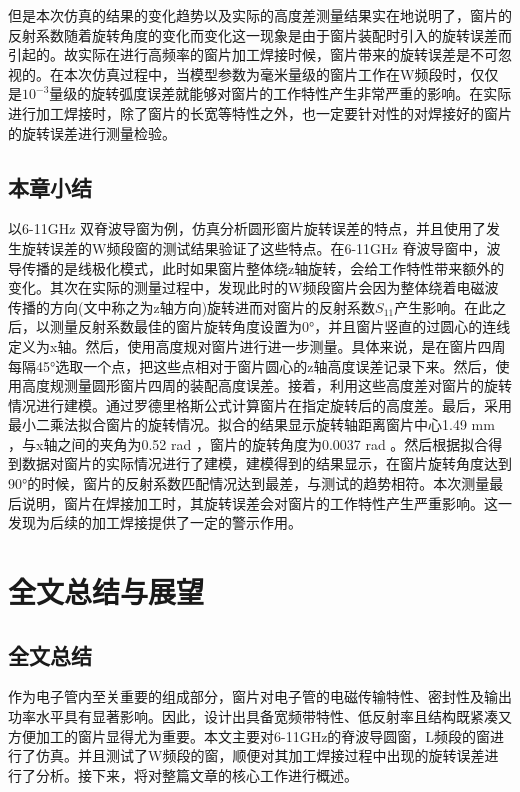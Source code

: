 \documentclass[master]{thesis-uestc}
\begin{document}
但是本次仿真的结果的变化趋势以及实际的高度差测量结果实在地说明了，窗片的反射系数随着旋转角度的变化而变化这一现象是由于窗片装配时引入的旋转误差而引起的。故实际在进行高频率的窗片加工焊接时候，窗片带来的旋转误差是不可忽视的。在本次仿真过程中，当模型参数为毫米量级的窗片工作在W频段时，仅仅是\(10^{-3}\)量级的旋转弧度误差就能够对窗片的工作特性产生非常严重的影响。在实际进行加工焊接时，除了窗片的长宽等特性之外，也一定要针对性的对焊接好的窗片的旋转误差进行测量检验。

\section{本章小结}
以6-11GHz 双脊波导窗为例，仿真分析圆形窗片旋转误差的特点，并且使用了发生旋转误差的W频段窗的测试结果验证了这些特点。在6-11GHz 脊波导窗中，波导传播的是线极化模式，此时如果窗片整体绕z轴旋转，会给工作特性带来额外的变化。其次在实际的测量过程中，发现此时的W频段窗片会因为整体绕着电磁波传播的方向(文中称之为z轴方向)旋转进而对窗片的反射系数\(S_{11}\)产生影响。在此之后，以测量反射系数最佳的窗片旋转角度设置为0°，并且窗片竖直的过圆心的连线定义为x轴。然后，使用高度规对窗片进行进一步测量。具体来说，是在窗片四周每隔45°选取一个点，把这些点相对于窗片圆心的z轴高度误差记录下来。然后，使用高度规测量圆形窗片四周的装配高度误差。接着，利用这些高度差对窗片的旋转情况进行建模。通过罗德里格斯公式计算窗片在指定旋转后的高度差。最后，采用最小二乘法拟合窗片的旋转情况。拟合的结果显示旋转轴距离窗片中心1.49 mm ，与x轴之间的夹角为0.52 rad ，窗片的旋转角度为0.0037 rad 。然后根据拟合得到数据对窗片的实际情况进行了建模，建模得到的结果显示，在窗片旋转角度达到90°的时候，窗片的反射系数匹配情况达到最差，与测试的趋势相符。本次测量最后说明，窗片在焊接加工时，其旋转误差会对窗片的工作特性产生严重影响。这一发现为后续的加工焊接提供了一定的警示作用。

\chapter{全文总结与展望}

\section{全文总结}
作为电子管内至关重要的组成部分，窗片对电子管的电磁传输特性、密封性及输出功率水平具有显著影响。因此，设计出具备宽频带特性、低反射率且结构既紧凑又方便加工的窗片显得尤为重要。本文主要对6-11GHz的脊波导圆窗，L频段的窗进行了仿真。并且测试了W频段的窗，顺便对其加工焊接过程中出现的旋转误差进行了分析。接下来，将对整篇文章的核心工作进行概述。
\end{document}
